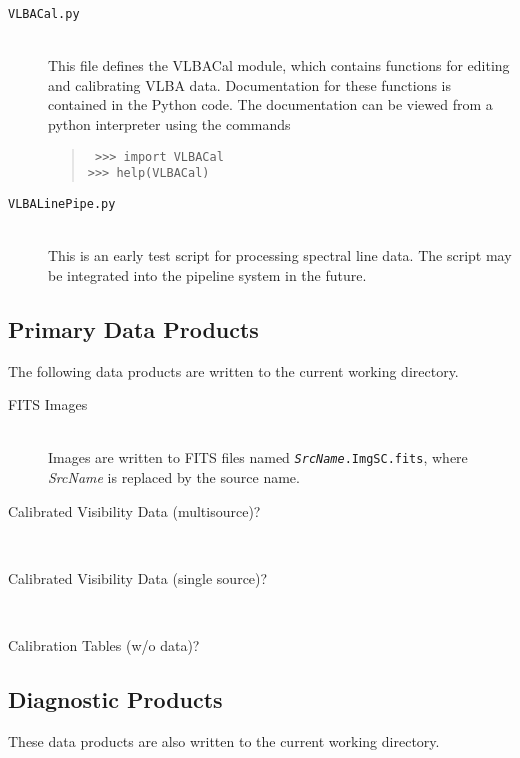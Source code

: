 \documentclass[10pt,onecolumn,final]{IEEEtran}
\begin{document}
\begin{description}
\item[\tt VLBACal.py] \hfill \\ This file defines the VLBACal module, which contains functions for editing and calibrating VLBA data.  Documentation for these functions is contained in the Python code.  The documentation can be viewed from a python interpreter using the commands
\begin{quote}\tt 
>>> import VLBACal \\
>>> help(VLBACal)
\end{quote}

\item[\tt VLBALinePipe.py] \hfill \\  This is an early test script for processing spectral line data.  The script may be integrated into the pipeline system in the future.
\end{description}

\subsection{Primary Data Products}

The following data products are written to the current working directory.

\begin{description}
\item[FITS Images] \hfill \\ Images are written to FITS files named {\tt{\em SrcName}.ImgSC.fits}, where {\em SrcName} is replaced by the source name.

\item[Calibrated Visibility Data (multisource)?] \hfill \\ 

\item[Calibrated Visibility Data (single source)?] \hfill \\ 

\item[Calibration Tables (w/o data)?] \hfill %
\end{description}

\subsection{Diagnostic Products}

These data products are also written to the current working directory.
\end{document}
